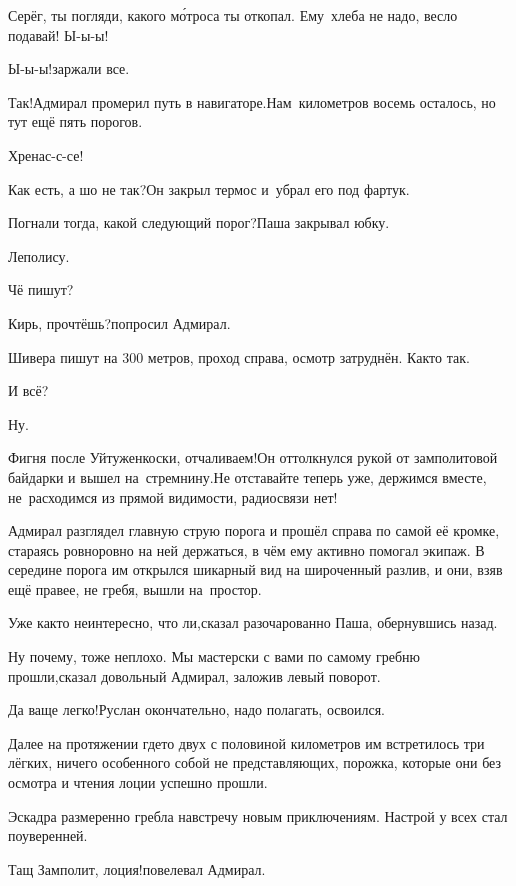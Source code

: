 \diagdash Серёг, ты погляди, какого м\'{о}троса ты откопал. Ему~хлеба не надо, весло подавай! Ы-ы-ы!

\diagdash Ы-ы-ы!\mdash заржали все.

\diagdash Так!\mdash Адмирал промерил путь в навигаторе.\mdash Нам~километров восемь осталось, но тут ещё пять порогов.

\diagdash Хренас-с-се!

\diagdash Как есть, а шо не так?\mdash Он закрыл термос и~убрал его под фартук.

\diagdash Погнали тогда, какой следующий порог?\mdash Паша закрывал юбку.

\diagdash Леполису.

\diagdash Чё пишут?

\diagdash Кирь, прочтёшь?\mdash попросил Адмирал.

\diagdash Шивера пишут на 300 метров, проход справа, осмотр затруднён. Как\sdash то так.

\diagdash И всё?

\diagdash Ну.

\diagdash Фигня после Уйтуженкоски, отчаливаем!\mdash Он оттолкнулся рукой от замполитовой байдарки и вышел на~стремнину.\mdash Не отставайте теперь уже, держимся вместе, не~расходимся из прямой видимости, радиосвязи нет!

Адмирал разглядел главную струю порога и прошёл справа по самой её кромке, стараясь ровно\sdash ровно на ней держаться, в чём ему активно помогал экипаж. В середине порога им открылся шикарный вид на широченный разлив, и они, взяв ещё правее, не гребя, вышли на~простор.

\diagdash Уже как\sdash то неинтересно, что ли,\mdash сказал разочарованно Паша, обернувшись назад.

\diagdash Ну почему, тоже неплохо. Мы мастерски с вами по самому гребню прошли,\mdash сказал довольный Адмирал, заложив левый поворот.

\diagdash Да ваще легко!\mdash Руслан окончательно, надо полагать, освоился.

Далее на протяжении где\sdash то двух с половиной километров им встретилось три лёгких, ничего особенного собой не представляющих, порожка, которые они без осмотра и чтения лоции успешно прошли.

Эскадра размеренно гребла навстречу новым приключениям. Настрой у всех стал поуверенней.

\diagdash Тащ Замполит, лоция!\mdash повелевал Адмирал.

